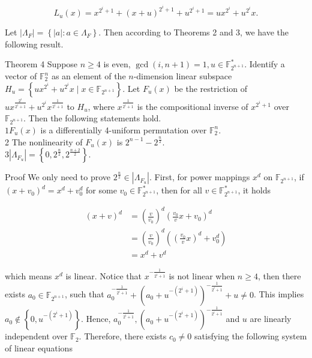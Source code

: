 \documentclass[10pt]{article}
\begin{document}
$$
L_{u}(x)=x^{2^{i}+1}+(x+u)^{2^{i}+1}+u^{2^{i}+1}=u x^{2^{i}}+u^{2^{i}} x .
$$

Let $\left|\Lambda_{F}\right|=\left\{|a|: a \in \Lambda_{F}\right\}$. Then according to Theorems 2 and 3, we have the following result.

Theorem 4 Suppose $n \geq 4$ is even, $\operatorname{gcd}(i, n+1)=1, u \in \mathbb{F}_{2^{n+1}}^{*}$. Identify a vector of $\mathbb{F}_{2}^{n}$ as an element of the $n$-dimension linear subspace $H_{u}=\left\{u x^{2^{i}}+u^{2^{i}} x \mid x \in \mathbb{F}_{2^{n+1}}\right\}$. Let $F_{u}(x)$ be the restriction of $u x^{\frac{2^{i}}{2^{i}+1}}+u^{2^{i}} x^{\frac{1}{2^{i}+1}}$ to $H_{u}$, where $x^{\frac{1}{2^{i}+1}}$ is the compositional inverse of $x^{2^{i}+1}$ over $\mathbb{F}_{2^{n+1}}$. Then the following statements hold.\\
$1 F_{u}(x)$ is a differentially 4-uniform permutation over $\mathbb{F}_{2}^{n}$.\\
2 The nonlinearity of $F_{u}(x)$ is $2^{n-1}-2^{\frac{n}{2}}$.\\
$3\left|\Lambda_{F_{u}}\right|=\left\{0,2^{\frac{n}{2}}, 2^{\frac{n+2}{2}}\right\}$.

Proof We only need to prove $2^{\frac{n}{2}} \in\left|\Lambda_{F_{u}}\right|$. First, for power mappings $x^{d}$ on $\mathbb{F}_{2^{n+1}}$, if $\left(x+v_{0}\right)^{d}=x^{d}+v_{0}^{d}$ for some $v_{0} \in \mathbb{F}_{2^{n+1}}^{*}$, then for all $v \in \mathbb{F}_{2^{n+1}}^{*}$, it holds

$$
\begin{aligned}
(x+v)^{d} & =\left(\frac{v}{v_{0}}\right)^{d}\left(\frac{v_{0}}{v} x+v_{0}\right)^{d} \\
& =\left(\frac{v}{v_{0}}\right)^{d}\left(\left(\frac{v_{0}}{v} x\right)^{d}+v_{0}^{d}\right) \\
& =x^{d}+v^{d}
\end{aligned}
$$

which means $x^{d}$ is linear. Notice that $x^{-\frac{1}{2^{i}+1}}$ is not linear when $n \geq 4$, then there exists $a_{0} \in \mathbb{F}_{2^{n+1}}$, such that $a_{0}^{-\frac{1}{2^{i}+1}}+\left(a_{0}+u^{-\left(2^{i}+1\right)}\right)^{-\frac{1}{2^{i}+1}}+u \neq 0$. This implies $a_{0} \notin\left\{0, u^{-\left(2^{i}+1\right)}\right\}$. Hence, $a_{0}^{-\frac{1}{2^{i}+1}},\left(a_{0}+u^{-\left(2^{i}+1\right)}\right)^{-\frac{1}{2^{i}+1}}$ and $u$ are linearly independent over $\mathbb{F}_{2}$. Therefore, there exists $c_{0} \neq 0$ satisfying the following system of linear equations
\end{document}
